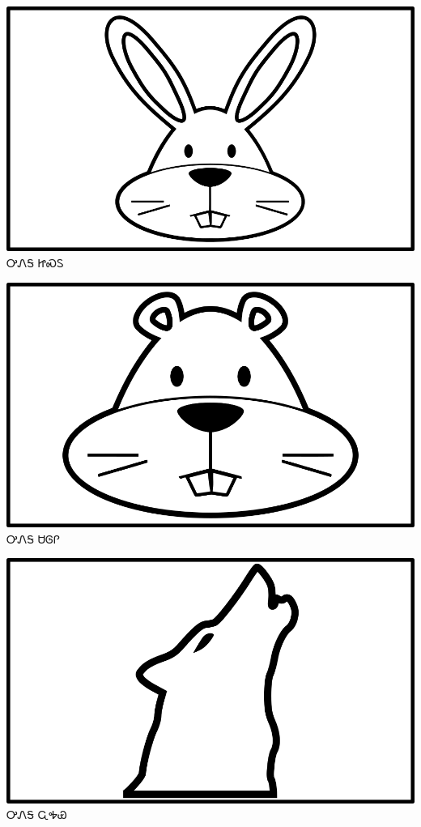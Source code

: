 \documentclass[avery5371]{flashcards}%
\begin{document}
    \begin{flashcard}{
        \includegraphics[width=0.95\columnwidth,height=.51\columnwidth,keepaspectratio]{../artwork/objects-animate/jisdu}
    }
        \Huge ᎤᏁᎦ ᏥᏍᏚ
    \end{flashcard}

    \begin{flashcard}{
        \includegraphics[width=0.95\columnwidth,height=.51\columnwidth,keepaspectratio]{../artwork/objects-animate/saloli}
    }
        \Huge ᎤᏁᎦ ᏌᎶᎵ
    \end{flashcard}

    \begin{flashcard}{
        \includegraphics[width=0.95\columnwidth,height=.51\columnwidth,keepaspectratio]{../artwork/objects-animate/wahya}
    }
        \Huge ᎤᏁᎦ ᏩᎭᏯ
    \end{flashcard}
\end{document}
